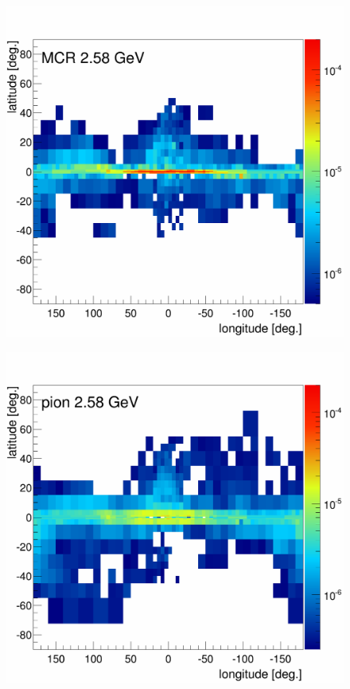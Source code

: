 \begin{figure}
\begin{minipage}[h]{0.45\textwidth}
  	\label{fig:MCRonly_skymap_IC}
  \end{minipage}
  \hfill
  \begin{minipage}[h]{0.45\textwidth}
  	\centering
	\includegraphics[width=1.\linewidth]{pic/results/MCRonly_MCR_fluxE12_skymap.png}
  	\label{fig:MCRonly_skymap_MCR}
  \end{minipage}
  \hfill
  \begin{minipage}[h]{0.45\textwidth}
  	\centering
	\includegraphics[width=1.\linewidth]{pic/results/MCRonly_PCR_fluxE12_skymap.png}

\end{minipage}
\end{figure}
